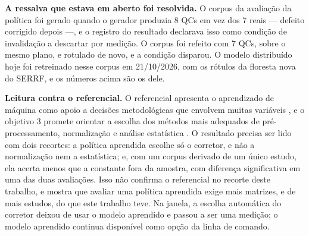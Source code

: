 
\textbf{A ressalva que estava em aberto foi resolvida.} O corpus da avaliação da política foi gerado quando o gerador produzia 8 QCs em vez dos 7 reais --- defeito corrigido depois ---, e o registro do resultado declarava isso como condição de invalidação a descartar por medição. O corpus foi refeito com 7 QCs, sobre o mesmo plano, e rotulado de novo, e a condição disparou. O modelo distribuído hoje foi retreinado nesse corpus em 21/10/2026, com os rótulos da floresta nova do SERRF, e os números acima são os dele.


\textbf{Leitura contra o referencial.} O referencial apresenta o aprendizado de máquina como apoio a decisões metodológicas que envolvem muitas variáveis \cite{sen2021deep}, e o objetivo 3 promete orientar a escolha dos métodos mais adequados de pré-processamento, normalização e análise estatística \cite{galal2022applications}. O resultado precisa ser lido com dois recortes: a política aprendida escolhe só o corretor, e não a normalização nem a estatística; e, com um corpus derivado de um único estudo, ela acerta menos que a constante fora da amostra, com diferença significativa em uma das duas avaliações. Isso não confirma o referencial no recorte deste trabalho, e mostra que avaliar uma política aprendida exige mais matrizes, e de mais estudos, do que este trabalho teve. Na janela, a escolha automática do corretor deixou de usar o modelo aprendido e passou a ser uma medição; o modelo aprendido continua disponível como opção da linha de comando.

